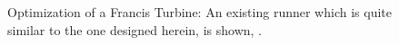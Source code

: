 \begin{figure}[h!]
\begin{minipage}[b]{1\linewidth}
 \centering
\end{minipage}
\caption{Optimization of a Francis Turbine: An existing runner which is quite similar to the one designed herein, is shown, \cite{andritz}. }%
\label{design-parameterization}
\end{figure}


